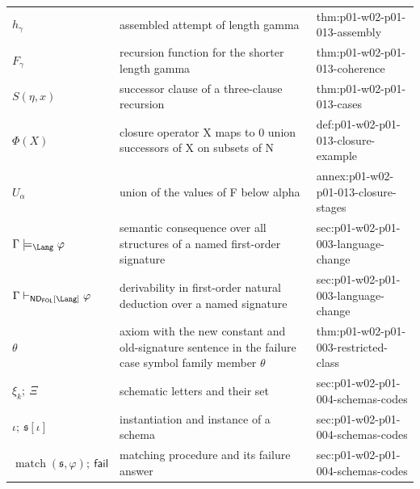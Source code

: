 \begin{longtable}{@{}p{}p{}p{}@{}}
\(h_\gamma\) & assembled attempt of length gamma & thm:\allowbreak{}p01-\allowbreak{}w02-\allowbreak{}p01-\allowbreak{}013-\allowbreak{}assembly \\
\(F_\gamma\) & recursion function for the shorter length gamma & thm:\allowbreak{}p01-\allowbreak{}w02-\allowbreak{}p01-\allowbreak{}013-\allowbreak{}coherence \\
\(S(\eta,\allowbreak x)\) & successor clause of a three-clause recursion & thm:\allowbreak{}p01-\allowbreak{}w02-\allowbreak{}p01-\allowbreak{}013-\allowbreak{}cases \\
\(\Phi(X)\) & closure operator X maps to {0} union successors of X on subsets of N & def:\allowbreak{}p01-\allowbreak{}w02-\allowbreak{}p01-\allowbreak{}013-\allowbreak{}closure-\allowbreak{}example \\
\(U_\alpha\) & union of the values of F below alpha & annex:\allowbreak{}p01-\allowbreak{}w02-\allowbreak{}p01-\allowbreak{}013-\allowbreak{}closure-\allowbreak{}stages \\
\(\Gamma\models_{\Lang}\varphi\) & semantic consequence over all structures of a named first-order signature & sec:\allowbreak{}p01-\allowbreak{}w02-\allowbreak{}p01-\allowbreak{}003-\allowbreak{}language-\allowbreak{}change \\
\(\Gamma\vdash_{\mathsf{ND}_{\mathsf{FOL}}[\Lang]}\varphi\) & derivability in first-order natural deduction over a named signature & sec:\allowbreak{}p01-\allowbreak{}w02-\allowbreak{}p01-\allowbreak{}003-\allowbreak{}language-\allowbreak{}change \\
\(\theta\) & axiom with the new constant and old-signature sentence in the failure case symbol family member \(\theta\) & thm:\allowbreak{}p01-\allowbreak{}w02-\allowbreak{}p01-\allowbreak{}003-\allowbreak{}restricted-\allowbreak{}class \\
\(\xi_k;\allowbreak \ \Xi\) & schematic letters and their set & sec:\allowbreak{}p01-\allowbreak{}w02-\allowbreak{}p01-\allowbreak{}004-\allowbreak{}schemas-\allowbreak{}codes \\
\(\iota;\allowbreak \ \mathfrak s[\iota]\) & instantiation and instance of a schema & sec:\allowbreak{}p01-\allowbreak{}w02-\allowbreak{}p01-\allowbreak{}004-\allowbreak{}schemas-\allowbreak{}codes \\
\(\operatorname{match}(\mathfrak s,\allowbreak \varphi);\allowbreak \ \mathsf{fail}\) & matching procedure and its failure answer & sec:\allowbreak{}p01-\allowbreak{}w02-\allowbreak{}p01-\allowbreak{}004-\allowbreak{}schemas-\allowbreak{}codes \\

\end{longtable}
